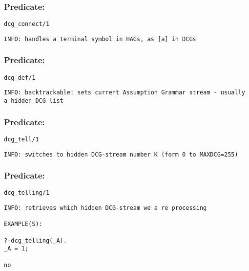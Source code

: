 \subsubsection{Predicate:} \label{dcgV95WconnectV95W1}

\begin{verbatim}
dcg_connect/1
\end{verbatim}

{\small \begin{verbatim}
INFO: handles a terminal symbol in HAGs, as [a] in DCGs

\end{verbatim}}

\subsubsection{Predicate:} \label{dcgV95WdefV95W1}

\begin{verbatim}
dcg_def/1
\end{verbatim}

{\small \begin{verbatim}
INFO: backtrackable: sets current Assumption Grammar stream - usually a hidden DCG list

\end{verbatim}}

\subsubsection{Predicate:} \label{dcgV95WtellV95W1}

\begin{verbatim}
dcg_tell/1
\end{verbatim}

{\small \begin{verbatim}
INFO: switches to hidden DCG-stream number K (form 0 to MAXDCG=255)

\end{verbatim}}

\subsubsection{Predicate:} \label{dcgV95WtellingV95W1}

\begin{verbatim}
dcg_telling/1
\end{verbatim}

{\small \begin{verbatim}
INFO: retrieves which hidden DCG-stream we a re processing

EXAMPLE(S):

?-dcg_telling(_A).
_A = 1;

no

\end{verbatim}}

